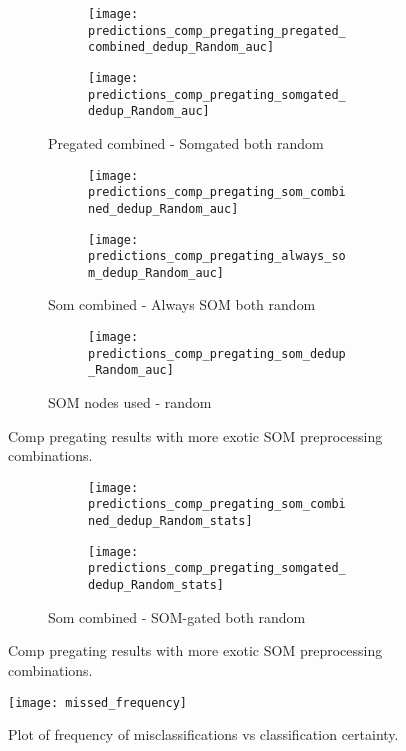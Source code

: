\documentclass[11pt,a4paper]{article}
\begin{document}
\begin{figure}
   \centering
   \begin{subfigure}{\textwidth}
      \begin{subfigure}{0.5\columnwidth}
         \texttt{[image: predictions\_comp\_pregating\_pregated\_combined\_dedup\_Random\_auc]}
      \end{subfigure}
      \begin{subfigure}{0.5\columnwidth}
         \texttt{[image: predictions\_comp\_pregating\_somgated\_dedup\_Random\_auc]}
      \end{subfigure}
      \caption{Pregated combined - Somgated both random}
   \end{subfigure}

   \begin{subfigure}{\textwidth}
      \begin{subfigure}{0.5\columnwidth}
         \texttt{[image: predictions\_comp\_pregating\_som\_combined\_dedup\_Random\_auc]}
      \end{subfigure}
      \begin{subfigure}{0.5\columnwidth}
         \texttt{[image: predictions\_comp\_pregating\_always\_som\_dedup\_Random\_auc]}
      \end{subfigure}
      \caption{Som combined - Always SOM both random}
   \end{subfigure}

   \begin{subfigure}{\textwidth}
      \begin{subfigure}{0.5\columnwidth}
         \texttt{[image: predictions\_comp\_pregating\_som\_dedup\_Random\_auc]}
      \end{subfigure}
      \caption{SOM nodes used - random}
   \end{subfigure}

   \caption{Comp pregating results with more exotic SOM preprocessing combinations.}
\end{figure}

\begin{figure}
   \centering

   \begin{subfigure}{\textwidth}
      \begin{subfigure}{0.5\columnwidth}
         \texttt{[image: predictions\_comp\_pregating\_som\_combined\_dedup\_Random\_stats]}
      \end{subfigure}
      \begin{subfigure}{0.5\columnwidth}
         \texttt{[image: predictions\_comp\_pregating\_somgated\_dedup\_Random\_stats]}
      \end{subfigure}
      \caption{Som combined - SOM-gated both random}
   \end{subfigure}

   \caption{Comp pregating results with more exotic SOM preprocessing combinations.}
\end{figure}

\begin{figure}
   \centering
   \texttt{[image: missed\_frequency]}
   \caption{Plot of frequency of misclassifications vs classification certainty.}
\end{figure}
\end{document}
